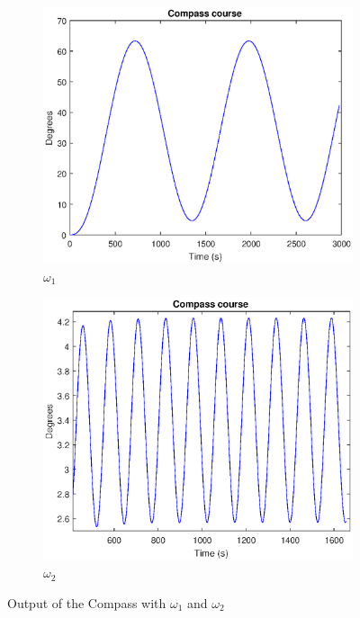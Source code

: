 \begin{figure}[H]
\begin{subfigure}{0.5\textwidth}
    \includegraphics[width=1\linewidth]{Part1_pics/p1b_omega1.eps}
    \caption{$\omega_1$}
\end{subfigure}
\begin{subfigure}{0.5\textwidth}
    \includegraphics[width=1\linewidth]{Part1_pics/p1b_omega2_zoomedin.eps}
    \caption{$\omega_2$}
\end{subfigure}
\caption{Output of the Compass with $\omega_1$ and $\omega_2$}
\label{fig:p1b}
\end{figure}


